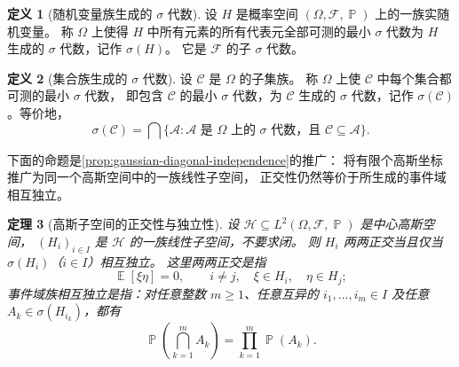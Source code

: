\documentclass[UTF8,11pt,a4paper,oneside,fontset=fandol]{ctexrep}
\numberwithin{equation}{section}
\theoremstyle{plain}
\newtheorem{theorem}{定理}[section]
\theoremstyle{definition}
\newtheorem{definition}[theorem]{定义}
\theoremstyle{remark}
\newcommand{\F}{\mathcal{F}}
\newcommand{\Hcal}{\mathcal{H}}
\DeclareMathOperator{\Prob}{\mathbb{P}}
\DeclareMathOperator{\E}{\mathbb{E}}
\begin{document}
\begin{definition}[随机变量族生成的 $\sigma$ 代数]
\label{def:sigma-algebra-generated-by-variables}
设 $H$ 是概率空间 $(\Omega,\F,\Prob)$ 上的一族实随机变量。
称 $\Omega$ 上使得 $H$ 中所有元素的所有代表元全部可测的最小 $\sigma$ 代数为
$H$ 生成的 $\sigma$ 代数，记作 $\sigma(H)$。
它是 $\F$ 的子 $\sigma$ 代数。
\end{definition}

\begin{definition}[集合族生成的 $\sigma$ 代数]
\label{def:sigma-algebra-generated-by-sets}
设 $\mathcal C$ 是 $\Omega$ 的子集族。
称 $\Omega$ 上使 $\mathcal C$ 中每个集合都可测的最小 $\sigma$ 代数，
即包含 $\mathcal C$ 的最小 $\sigma$ 代数，为 $\mathcal C$ 生成的
$\sigma$ 代数，记作 $\sigma(\mathcal C)$。等价地，
\[
  \sigma(\mathcal C)
  =\bigcap\bigl\{\mathcal A:
       \mathcal A\text{ 是 $\Omega$ 上的 $\sigma$ 代数，且 }
       \mathcal C\subseteq\mathcal A\bigr\}.
\]
\end{definition}

下面的命题是\cref{prop:gaussian-diagonal-independence}的推广：
将有限个高斯坐标推广为同一个高斯空间中的一族线性子空间，
正交性仍然等价于所生成的事件域相互独立。

\begin{theorem}[高斯子空间的正交性与独立性]
\label{prop:gaussian-subspaces-orthogonality-independence}
设 $\Hcal\subseteq L^2(\Omega,\F,\Prob)$ 是中心高斯空间，
$(H_i)_{i\in I}$ 是 $\Hcal$ 的一族线性子空间，不要求闭。
则 $H_i$ 两两正交当且仅当 $\sigma(H_i)$（$i\in I$）相互独立。
这里两两正交是指
\[
  \E[\xi\eta]=0,
  \qquad i\ne j,\quad \xi\in H_i,\quad\eta\in H_j;
\]
事件域族相互独立是指：对任意整数 $m\ge1$、任意互异的
$i_1,\ldots,i_m\in I$ 及任意 $A_k\in\sigma(H_{i_k})$，都有
\begin{equation}
  \label{eq:gaussian-subspace-sigma-independence}
  \Prob\!\left(\bigcap_{k=1}^{m}A_k\right)
  =\prod_{k=1}^{m}\Prob(A_k).
\end{equation}
\end{theorem}
\end{document}
